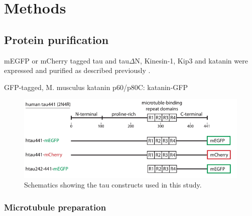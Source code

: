 \chapter{Methods}
\label{methods}
\section{Protein purification} 
mEGFP or mCherry tagged tau and tau$\Delta$N, Kinesin-1, Kip3 and katanin were expressed and purified as described previously \parencite{HERNANDEZVEGA20172304,Herrmann2018,Mitra2018,NITZSCHE2010247}.

GFP-tagged, M. musculus katanin p60/p80C: katanin-GFP \parencite{Jiang2017}


\begin{figure}[h]
	\centering
	\includegraphics[width=0.6\linewidth]{Figures/tauconstructs.png}
	\caption[Schematics showing the tau constructs used in this study.]{
		Schematics showing the tau constructs used in this study.
		}\label{tauconstructs}
\end{figure}


\subsection{Microtubule preparation}
